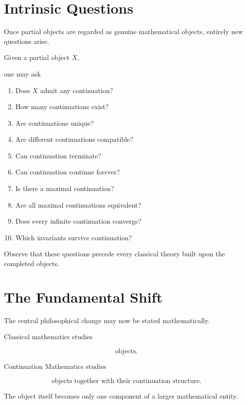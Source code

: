 \documentclass[13pt,openany]{book}
\theoremstyle{plain}
\theoremstyle{definition}
\begin{document}
\section{Intrinsic Questions}

Once partial objects are regarded as genuine mathematical objects,
entirely new questions arise.

Given a partial object \(X\),

one may ask

\begin{enumerate}
\item Does \(X\) admit any continuation?
\item How many continuations exist?
\item Are continuations unique?
\item Are different continuations compatible?
\item Can continuation terminate?
\item Can continuation continue forever?
\item Is there a maximal continuation?
\item Are all maximal continuations equivalent?
\item Does every infinite continuation converge?
\item Which invariants survive continuation?
\end{enumerate}

Observe that these questions precede every classical theory built upon the
completed objects.

\section{The Fundamental Shift}

The central philosophical change may now be stated mathematically.

Classical mathematics studies

\[
\boxed{\text{objects}.}
\]

Continuation Mathematics studies

\[
\boxed{\text{objects together with their continuation structure}.}
\]

The object itself becomes only one component of a larger mathematical
entity.
\end{document}
